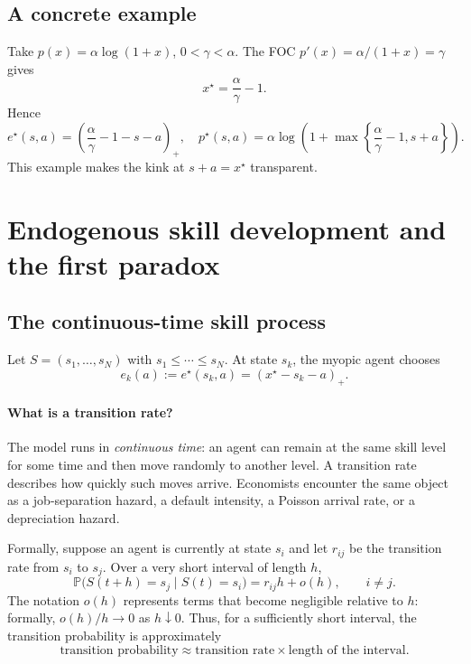 \documentclass[11pt]{article}
\theoremstyle{tutorial}
\theoremstyle{remark}
\newcommand{\Pp}{\mathbb{P}}
\newcommand{\1}{\mathbb{I}}
\newcommand{\pos}[1]{\left(#1\right)_{+}}
\begin{document}
\subsection{A concrete example}

Take $p(x)=\alpha\log(1+x)$, $0<\gamma<\alpha$.  The FOC $p'(x)=\alpha/(1+x)=\gamma$ gives
\[
  x^\star=\frac{\alpha}{\gamma}-1.
\]
Hence
\[
e^\star(s,a)=\pos{\frac{\alpha}{\gamma}-1-s-a},
\quad
p^\star(s,a)=\alpha\log\!\left(1+\max\left\{\frac{\alpha}{\gamma}-1,s+a\right\}\right).
\]
This example makes the kink at $s+a=x^\star$ transparent.

\section{Endogenous skill development and the first paradox}

\subsection{The continuous-time skill process}

Let $S=(s_1,\ldots,s_N)$ with $s_1\le\cdots\le s_N$.  At state $s_k$, the myopic agent chooses
\[
  e_k(a):=e^\star(s_k,a)=\pos{x^\star-s_k-a}.
\]

\paragraph{What is a transition rate?}
The model runs in \emph{continuous time}: an agent can remain at the same skill level for some time and then
move randomly to another level.  A transition rate describes how quickly such moves arrive.  Economists
encounter the same object as a job-separation hazard, a default intensity, a Poisson arrival rate, or a
depreciation hazard.

Formally, suppose an agent is currently at state $s_i$ and let $r_{ij}$ be the transition rate from $s_i$ to
$s_j$.  Over a very short interval of length $h$,
\begin{equation}
\Pp\bigl(S(t+h)=s_j\mid S(t)=s_i\bigr)=r_{ij}h+o(h),
\qquad i\ne j.
\label{eq:transition-rate-definition}
\end{equation}
The notation $o(h)$ represents terms that become negligible relative to $h$: formally,
$o(h)/h\to0$ as $h\downarrow0$.  Thus, for a sufficiently short interval, the transition probability is
approximately
\[
  \text{transition probability}\approx\text{transition rate}\times\text{length of the interval}.
\]
\end{document}
